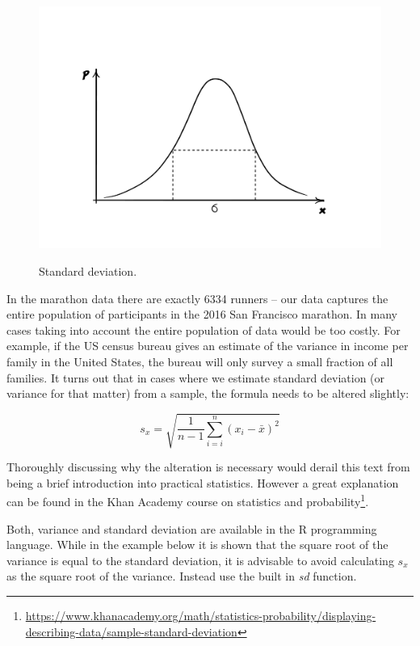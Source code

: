 \documentclass{tufte-book} %
\begin{document}
\begin{figure}
	\centering
	\includegraphics[trim={4cm 3cm 4cm 5cm},clip]{graphics/variance}
	\label{img:variance}
	\caption{Standard deviation.}
\end{figure}

In the marathon data there are exactly 6334 runners -- our data captures the entire population of participants in the 2016 San Francisco marathon. In many cases taking into account the entire population of data would be too costly. For example, if the US census bureau gives an estimate of the variance in income per family in the United States, the bureau will only survey a small fraction of all families. It turns out that in cases where we estimate standard deviation (or variance for that matter) from a sample, the formula needs to be altered slightly:

\begin{equation} \label{formula:sample-standard-deviation}
	s_x = \sqrt{\frac{1}{n - 1} \sum_{i=i}^{n} (x_i - \bar{x})^2}
\end{equation}

Thoroughly discussing why the alteration is necessary would derail this text from being a brief introduction into practical statistics. However a great explanation can be found in the Khan Academy course on statistics and probability\footnote{\url{https://www.khanacademy.org/math/statistics-probability/displaying-describing-data/sample-standard-deviation}}.

Both, variance and standard deviation are available in the R programming language. While in the example below it is shown that the square root of the variance is equal to the standard deviation, it is advisable to avoid calculating $s_x$ as the square root of the variance. Instead use the built in {\em sd} function.
\end{document}

